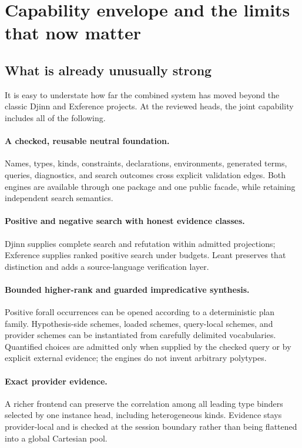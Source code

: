 \documentclass[11pt]{article}
\newcommand{\Djinn}{Djinn}
\newcommand{\Exference}{Exference}
\begin{document}
\section{Capability envelope and the limits that now matter}

\subsection{What is already unusually strong}

It is easy to understate how far the combined system has moved beyond the
classic \Djinn{} and \Exference{} projects.  At the reviewed heads, the joint
capability includes all of the following.

\paragraph{A checked, reusable neutral foundation.}
Names, types, kinds, constraints, declarations, environments, generated terms,
queries, diagnostics, and search outcomes cross explicit validation edges.
Both engines are available through one package and one public facade, while
retaining independent search semantics.

\paragraph{Positive and negative search with honest evidence classes.}
\Djinn{} supplies complete search and refutation within admitted projections;
\Exference{} supplies ranked positive search under budgets.  Leant preserves
that distinction and adds a source-language verification layer.

\paragraph{Bounded higher-rank and guarded impredicative synthesis.}
Positive forall occurrences can be opened according to a deterministic plan
family.  Hypothesis-side schemes, loaded schemes, query-local schemes, and
provider schemes can be instantiated from carefully delimited vocabularies.
Quantified choices are admitted only when supplied by the checked query or by
explicit external evidence; the engines do not invent arbitrary polytypes.

\paragraph{Exact provider evidence.}
A richer frontend can preserve the correlation among all leading type binders
selected by one instance head, including heterogeneous kinds.  Evidence stays
provider-local and is checked at the session boundary rather than being
flattened into a global Cartesian pool.
\end{document}
